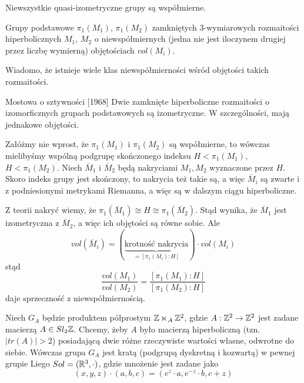 Niewszystkie quasi-izometryczne grupy są współmierne.

\begin{example}[m]
\item Grupy podstawowe $\pi_1(M_1)$, $\pi_1(M_2)$ zamkniętych $3$-wymiarowych rozmaitości hiperbolicznych $M_1$, $M_2$ o niewspółmiernych (jedna nie jest iloczynem drugiej przez liczbę wymierną) objętościach $vol(M_i)$.

  Wiadomo, że istnieje wiele klas niewspółmierności wśród objętości takich rozmaitości.

  \begin{theorem}{Mostowa o sztywności [1968]}{}
    Dwie zamknięte hiperboliczne rozmaitości o izomorficznych grupach podstawowych są izometryczne. W szczególności, mają jednakowe objętości.
  \end{theorem}

  Załóżmy nie wprost, że $\pi_1(M_1)$ i $\pi_1(M_2)$ są współmierne, to wówczas mielibyśmy wspólną podgrupę skończonego indeksu $H< \pi_1(M_1)$, $H<\pi_1(M_2)$. Niech $\overline{M}_1$ i $\overline{M}_2$ będą nakryciami $M_1,M_2$ wyznaczone przez $H$. Skoro indeks grupy jest skończony, to nakrycia też takie są, a więc $\overline{M}_i$ są zwarte i z podniesionymi metrykami Riemanna, a więc są w dalszym ciągu hiperboliczne.

  Z teorii nakryć wiemy, że $\pi_1(\overline{M}_1)\cong H\cong \pi_1(\overline{M}_2)$. Stąd wynika, że $\overline{M}_1$ jest izometryczna z $\overline{M}_2$, a więc ich objętości są równe sobie. Ale 
  $$vol(\overline{M}_i)=(\underbrace{\text{krotność nakrycia}}_{=[\pi_1(M_i):H]})\cdot vol(M_i)$$
  stąd 
  $$\frac{vol(M_1)}{vol(M_2)}=\frac{[\pi_1(M_1):H]}{[\pi_1(M_2):H]}$$
  daje sprzeczność z niewspółmiernością.
\item Niech $G_A$ będzie produktem półprostym $\mathbb{Z}\ltimes_A\mathbb{Z}^2$, gdzie $A:\mathbb{Z}^2\to \mathbb{Z}^2$ jest zadane macierzą $A\in Sl_2\mathbb{Z}$. Chcemy, żeby $A$ było macierzą hiperboliczną (tzn. $|tr(A)|>2$) posiadającą dwie różne rzeczywiste wartości własne, odwrotne do siebie. Wówczas grupa $G_A$ jest kratą (podgrupą dyskretną i kozwartą) w pewnej grupie Liego $Sol=(\mathbb{R}^3,\cdot)$, gdzie mnożenie jest zadane jako
  $$(x,y,z)\cdot(a,b,c)=(e^z\cdot a,e^{-z}\cdot b,c+z)$$
\end{example}

